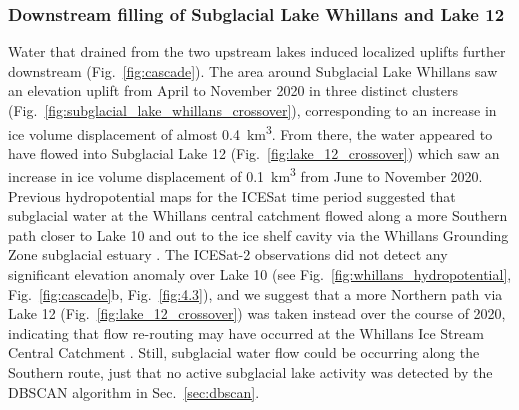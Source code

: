 \subsubsection{Downstream filling of Subglacial Lake Whillans and Lake 12}

Water that drained from the two upstream lakes induced localized uplifts further downstream (Fig.~\ref{fig:cascade}).
The area around Subglacial Lake Whillans \citep[Fig.~\ref{fig:subglacial_lake_whillans_dsm},][]{TulaczykWISSARDSubglacialLake2014} saw an elevation uplift from April to November 2020 in three distinct clusters (Fig.~\ref{fig:subglacial_lake_whillans_crossover}), corresponding to an increase in ice volume displacement of almost \SI{0.4}{\kilo\metre\cubed}.
From there, the water appeared to have flowed into Subglacial Lake 12 (Fig.~\ref{fig:lake_12_crossover}) which saw an increase in ice volume displacement of \SI{0.1}{\kilo\metre\cubed} from June to November 2020.
Previous hydropotential maps for the ICESat time period \citep[2003-2009, see Fig.~\ref{fig:whillans_hydropotential},][]{CarterEvidencerapidsubglacial2013} suggested that subglacial water at the Whillans central catchment flowed along a more Southern path closer to Lake 10 \citep{SiegfriedEpisodicicevelocity2016} and out to the ice shelf cavity via the Whillans Grounding Zone subglacial estuary \citep[see][]{HorganSubglacialLakeWhillans2012}.
The ICESat-2 observations did not detect any significant elevation anomaly over Lake 10 (see Fig.~\ref{fig:whillans_hydropotential}, Fig.~\ref{fig:cascade}b, Fig.~\ref{fig:4.3}), and we suggest that a more Northern path via Lake 12 (Fig.~\ref{fig:lake_12_crossover}) was taken instead over the course of 2020, indicating that flow re-routing may have occurred at the Whillans Ice Stream Central Catchment \citep[c.f.][]{CarterEvidencerapidsubglacial2013}.
Still, subglacial water flow could be occurring along the Southern route, just that no active subglacial lake activity was detected by the \gls{DBSCAN} algorithm in Sec.~\ref{sec:dbscan}.


